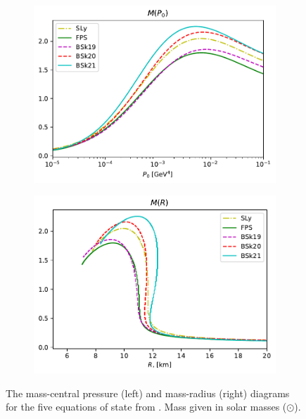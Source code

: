 \begin{figure}[h!]
    \centering
    \begin{subfigure}{.5\textwidth}
        \includegraphics[width=\textwidth]{images/tov/p0_analysis,all.pdf}
    \end{subfigure}%
    \begin{subfigure}{.5\textwidth}
        \includegraphics[width=\textwidth]{images/tov/r_analysis,all.pdf}
    \end{subfigure}
    \caption{The mass-central pressure (left) and mass-radius (right) diagrams for the five equations of state from \autocite{SLy_2004,BSk_2013}. Mass given in solar masses ($\odot$).}
    \label{fig: tov, all eos analyses}
\end{figure}

